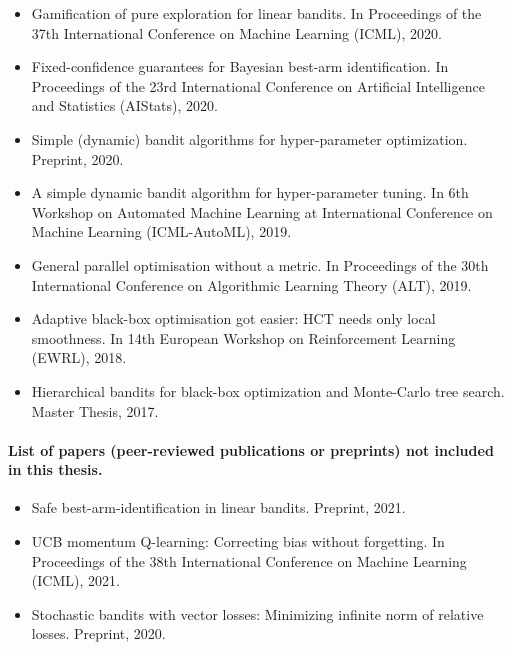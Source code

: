 \begin{itemize}[label=]
    \item Gamification of pure exploration for linear bandits. In Proceedings of the 37th International Conference on Machine Learning (ICML), 2020.~\citep{degenne2020game}
    \item Fixed-confidence guarantees for Bayesian best-arm identification. In Proceedings of the 23rd International Conference on Artificial Intelligence and Statistics (AIStats), 2020.\citep{shang2020t3c}
    \item Simple (dynamic) bandit algorithms for hyper-parameter optimization. Preprint, 2020.~\citep{shang2020dttts}
    \item A simple dynamic bandit algorithm for hyper-parameter tuning. In 6th Workshop on Automated Machine Learning at International Conference on Machine Learning (ICML-AutoML), 2019.~\citep{shang2019dttts}
    \item General parallel optimisation without a metric. In Proceedings of the 30th International Conference on Algorithmic Learning Theory (ALT), 2019.~\citep{shang2019adaptive}
    \item Adaptive black-box optimisation got easier: HCT needs only local smoothness. In 14th European Workshop on Reinforcement Learning (EWRL), 2018.~\citep{shang2018adaptive}
    \item Hierarchical bandits for black-box optimization and Monte-Carlo tree search. Master Thesis, 2017.~\citep{shang2017master}
\end{itemize}

\paragraph{List of papers (peer-reviewed publications or preprints) not included in this thesis.}

\begin{itemize}[label=]
    \item Safe best-arm-identification in linear bandits. Preprint, 2021.~\citep{shang2021safe}
    \item UCB momentum Q-learning: Correcting bias without forgetting. In Proceedings of the 38th International Conference on Machine Learning (ICML), 2021.~\citep{menard2021ucbmq}
    \item Stochastic bandits with vector losses: Minimizing infinite norm of relative losses. Preprint, 2020.~\citep{shang2020vector}
\end{itemize}

